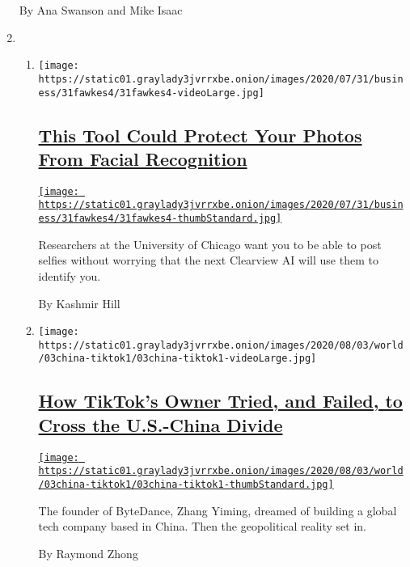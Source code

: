 \begin{enumerate}
  By Ana Swanson and Mike Isaac
\item
  \begin{enumerate}
  \def\labelenumii{\arabic{enumii}.}
  \item
    \texttt{[image: https://static01.graylady3jvrrxbe.onion/images/2020/07/31/business/31fawkes4/31fawkes4-videoLarge.jpg]}

    \hypertarget{this-tool-could-protect-your-photos-from-facial-recognition}{%
    \subsection{\texorpdfstring{\href{/2020/08/03/technology/fawkes-tool-protects-photos-from-facial-recognition.html}{This
    Tool Could Protect Your Photos From Facial
    Recognition}}{This Tool Could Protect Your Photos From Facial Recognition}}\label{this-tool-could-protect-your-photos-from-facial-recognition}}

    \href{/2020/08/03/technology/fawkes-tool-protects-photos-from-facial-recognition.html}{\texttt{[image: https://static01.graylady3jvrrxbe.onion/images/2020/07/31/business/31fawkes4/31fawkes4-thumbStandard.jpg]}}

    Researchers at the University of Chicago want you to be able to post
    selfies without worrying that the next Clearview AI will use them to
    identify you.

    By Kashmir Hill
  \item
    \texttt{[image: https://static01.graylady3jvrrxbe.onion/images/2020/08/03/world/03china-tiktok1/03china-tiktok1-videoLarge.jpg]}

    \hypertarget{how-tiktoks-owner-tried-and-failed-to-cross-the-us-china-divide}{%
    \subsection{\texorpdfstring{\href{/2020/08/03/technology/tiktok-bytedance-us-china.html}{How
    TikTok's Owner Tried, and Failed, to Cross the U.S.-China
    Divide}}{How TikTok's Owner Tried, and Failed, to Cross the U.S.-China Divide}}\label{how-tiktoks-owner-tried-and-failed-to-cross-the-us-china-divide}}

    \href{/2020/08/03/technology/tiktok-bytedance-us-china.html}{\texttt{[image: https://static01.graylady3jvrrxbe.onion/images/2020/08/03/world/03china-tiktok1/03china-tiktok1-thumbStandard.jpg]}}

    The founder of ByteDance, Zhang Yiming, dreamed of building a global
    tech company based in China. Then the geopolitical reality set in.

    By Raymond Zhong
  \end{enumerate}
\end{enumerate}

